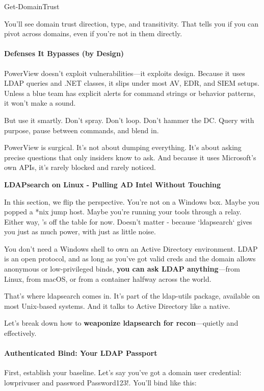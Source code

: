 Get-DomainTrust

You’ll see domain trust direction, type, and transitivity. That tells you if you can pivot across domains, even if you’re not in them directly.

\paragraph{\textbf{Defenses It Bypasses (by Design)}}

PowerView doesn’t exploit vulnerabilities—it exploits design. Because it uses LDAP queries and .NET classes, it slips under most AV, EDR, and SIEM setups. Unless a blue team has explicit alerts for command strings or behavior patterns, it won’t make a sound.

But use it smartly. Don’t spray. Don’t loop. Don’t hammer the DC. Query with purpose, pause between commands, and blend in.

PowerView is surgical. It’s not about dumping everything. It’s about asking precise questions that only insiders know to ask. And because it uses Microsoft’s own APIs, it’s rarely blocked and rarely noticed.

\textbf{LDAPsearch on Linux - Pulling AD Intel Without Touching  }

In this section, we flip the perspective. You’re not on a Windows box. Maybe you popped a *nix jump host. Maybe you’re running your tools through a relay. Either way,  ’s off the table for now. Doesn’t matter - because `ldapsearch` gives you just as much power, with just as little noise.

You don’t need a Windows shell to own an Active Directory environment. LDAP is an open protocol, and as long as you’ve got valid creds and the domain allows anonymous or low-privileged binds, \textbf{you can ask LDAP anything}—from Linux, from macOS, or from a container halfway across the world.

That’s where ldapsearch comes in. It’s part of the ldap-utils package, available on most Unix-based systems. And it talks to Active Directory like a native.

Let’s break down how to \textbf{weaponize ldapsearch for recon}—quietly and effectively.

\paragraph{\textbf{   Authenticated Bind: Your LDAP Passport}}

First, establish your baseline. Let’s say you’ve got a domain user credential: lowprivuser and password Password123!. You’ll bind like this:


